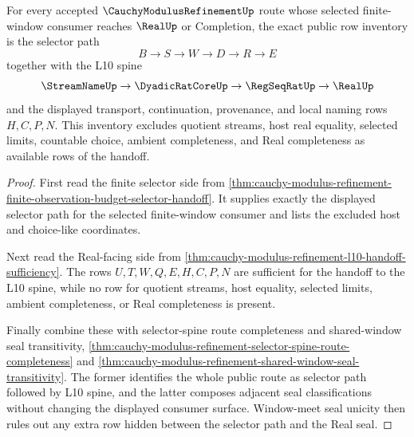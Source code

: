 \begin{theorem}
\label{thm:cauchy-modulus-refinement-l10-row-exactness}
For every accepted $\CauchyModulusRefinementUp$ route whose selected
finite-window consumer reaches $\RealUp$ or Completion, the exact public row
inventory is the selector path
$$
B \to S \to W \to D \to R \to E
$$
together with the L10 spine
$$
\StreamNameUp \to \DyadicRatCoreUp \to \RegSeqRatUp \to \RealUp
$$
and the displayed transport, continuation, provenance, and local naming rows
$H,C,P,N$. This inventory excludes quotient streams, host real equality,
selected limits, countable choice, ambient completeness, and Real completeness
as available rows of the handoff.
\end{theorem}
\begin{proof}
First read the finite selector side from
\autoref{thm:cauchy-modulus-refinement-finite-observation-budget-selector-handoff}.
It supplies exactly the displayed selector path for the selected finite-window
consumer and lists the excluded host and choice-like coordinates.

Next read the Real-facing side from
\autoref{thm:cauchy-modulus-refinement-l10-handoff-sufficiency}. The rows
$U,T,W,Q,E,H,C,P,N$ are sufficient for the handoff to the L10 spine, while no
row for quotient streams, host equality, selected limits, ambient completeness,
or Real completeness is present.

Finally combine these with selector-spine route completeness and
shared-window seal transitivity,
\autoref{thm:cauchy-modulus-refinement-selector-spine-route-completeness} and
\autoref{thm:cauchy-modulus-refinement-shared-window-seal-transitivity}. The
former identifies the whole public route as selector path followed by L10
spine, and the latter composes adjacent seal classifications without changing
the displayed consumer surface. Window-meet seal unicity then rules out any
extra row hidden between the selector path and the Real seal.
\end{proof}

